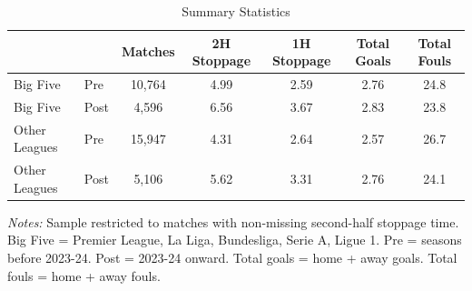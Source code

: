 \begin{table}[t]
\centering
\caption{Summary Statistics}
\label{tab:summary}
\small
\begin{tabular}{llccccc}
\toprule
 & & Matches & 2H Stoppage & 1H Stoppage & Total Goals & Total Fouls \\
\midrule
Big Five & Pre & 10,764 & 4.99 & 2.59 & 2.76 & 24.8 \\
Big Five & Post & 4,596 & 6.56 & 3.67 & 2.83 & 23.8 \\
Other Leagues & Pre & 15,947 & 4.31 & 2.64 & 2.57 & 26.7 \\
Other Leagues & Post & 5,106 & 5.62 & 3.31 & 2.76 & 24.1 \\
\bottomrule
\end{tabular}
\begin{tablenotes}\small
\item \textit{Notes:} Sample restricted to matches with non-missing second-half stoppage time. Big Five = Premier League, La Liga, Bundesliga, Serie A, Ligue 1. Pre = seasons before 2023-24. Post = 2023-24 onward. Total goals = home + away goals. Total fouls = home + away fouls.
\end{tablenotes}
\end{table}
